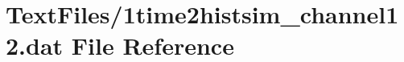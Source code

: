 \hypertarget{1time2histsim__channel12_8dat}{}\section{Text\+Files/1time2histsim\+\_\+channel12.dat File Reference}
\label{1time2histsim__channel12_8dat}
